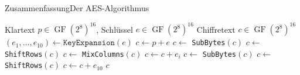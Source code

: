 \documentclass{beamer}
\newcommand{\expand}{\texttt{KeyExpansion}}
\newcommand{\GF}{\operatorname{GF}}
\theoremstyle{plain}
\begin{document}
 
\begin{frame}{Zusammenfassung}{Der AES-Algorithmus}
 \begin{algorithmic}
  \Require Klartext $p \in \GF(2^8)^{16}$, Schlüssel $e \in \GF(2^8)^{16}$
  \Ensure Chiffretext $c \in \GF(2^8)^{16}$
  \State $(e_1, \dots, e_{10}) \gets \expand(e)$
  \State $c \gets p + e$
  \State $c \gets$ \texttt{SubBytes}$(c)$
  \State $c \gets$ \texttt{ShiftRows}$(c)$
  \State $c \gets$ \texttt{MixColumns}$(c)$
  \State $c \gets c + e_i$
  \EndFor
  \State $c \gets $ \texttt{SubBytes}$(c)$
  \State $c \gets $ \texttt{ShiftRows}$(c)$
  \State $c \gets c + e_{10}$
  \State \Return $c$
 \end{algorithmic}
\end{frame}
\end{document}
